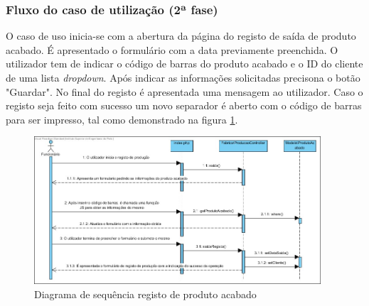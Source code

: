 \subsubsection*{Fluxo do caso de utilização (2ª fase)}
O caso de uso inicia-se com a abertura da página do registo de saída de produto acabado. É apresentado o formulário com a data previamente preenchida. O utilizador tem de indicar o código de barras do produto acabado e o ID do cliente de uma lista \textit{dropdown}.  Após indicar as informações solicitadas precisona o botão "Guardar". No final do registo é apresentada uma mensagem ao utilizador. Caso o registo seja feito com sucesso um novo separador é aberto com o código de barras para ser impresso, tal como demonstrado na figura \ref{fig:sd_saida_prod_acabado}.


\begin{figure}[H] 
	\begin{center}
		\includegraphics[width=0.95\textwidth,keepaspectratio]{figuras/Diagramas_vp/SD_Fabrica_5_Saida_de_Produto_Acabado.jpg}
		\caption{Diagrama de sequência registo de produto acabado}
		\label{fig:sd_saida_prod_acabado} 
	\end{center}
\end{figure}